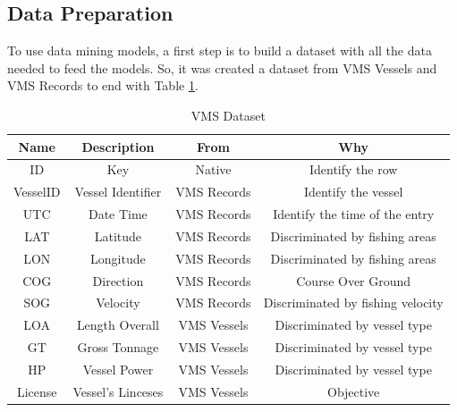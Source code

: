 


\subsection{Data Preparation} %
\label{sub:data_preparation}
To use data mining models, a first step is to build a dataset with all the data needed to feed the models. So, it was created a dataset from VMS Vessels and VMS Records to end with Table \ref{table:vms_dataset}. 

\begin {table}[H]
\begin{center}
\begin{tabular}{c|c|c|c}
\textbf{Name } & \textbf{Description} & \textbf{From} & \textbf{Why} \\
\hline
ID & Key & Native & Identify the row \\
VesselID & Vessel Identifier & VMS Records & Identify the vessel \\
UTC & Date Time & VMS Records &Identify the time of the entry\\
LAT & Latitude & VMS Records & Discriminated by fishing areas\\
LON & Longitude & VMS Records & Discriminated by fishing areas\\
COG & Direction & VMS Records & Course Over Ground\\
SOG & Velocity & VMS Records & Discriminated by fishing velocity\\
LOA & Length Overall & VMS Vessels & Discriminated by vessel type\\
GT & Gross Tonnage & VMS Vessels & Discriminated by vessel type\\
HP &Vessel Power & VMS Vessels & Discriminated by vessel type\\
License & Vessel's Linceses & VMS Vessels & Objective
\label{table:vms_dataset}
\end{tabular}
\caption {VMS Dataset}
\end{center}
\end {table}


